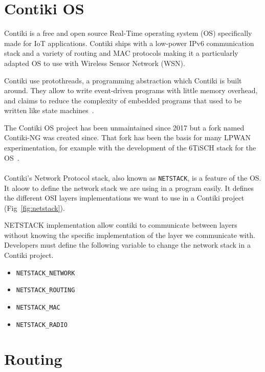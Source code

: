 \section{Contiki OS}

Contiki is a free and open source Real-Time operating system (OS) specifically made
for IoT applications. Contiki ships with a low-power IPv6 communication stack
and a variety of routing and MAC protocols making it a particularly adapted OS to
use with Wireless Sensor Network (WSN).

Contiki use protothreads, a programming abstraction which Contiki is
built around.
They allow to write event-driven programs with little memory overhead, and
claims to reduce the complexity of embedded programs that used to be written 
like state machines~\cite{10.1145/1182807.1182811}.

The Contiki OS project has been unmaintained since 2017 but a
fork named Contiki-NG was created since.
That fork has been the basis for many LPWAN experimentation, for example 
with the development of the 6TiSCH stack for the OS~\cite{Duquennoy2017TSCHA6}.

\paragraph{}

Contiki's Network Protocol stack, also known as \lstinline{NETSTACK}, is a
feature of the OS.
It aloow to define the network stack we are using in a program easily.
It defines the different OSI layers implementations we 
want to use in a Contiki project (Fig~\ref{fig:netstack}).

NETSTACK implementation allow contiki to communicate between layers without 
knowing the specific implementation of the layer we communicate with.
Developers must define the following variable to change the network stack 
in a Contiki project.

\begin{itemize}
  \item \lstinline{NETSTACK_NETWORK}
  \item \lstinline{NETSTACK_ROUTING}
  \item \lstinline{NETSTACK_MAC}
  \item \lstinline{NETSTACK_RADIO}
\end{itemize}



\section{Routing}

